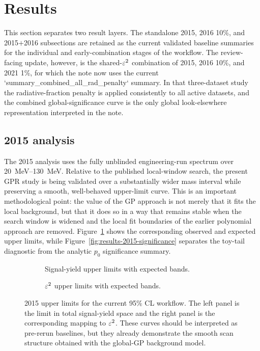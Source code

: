 \section{Results}
\label{sec:results}

This section separates two result layers. The standalone 2015, 2016 10\%, and
2015$+$2016 subsections are retained as the current validated baseline summaries for
the individual and early-combination stages of the workflow. The review-facing update,
however, is the shared-$\varepsilon^2$ combination of 2015, 2016 10\%, and 2021 1\%, for
which the note now uses the current `summary\_combined\_all\_rad\_penalty` summary. In
that three-dataset study the radiative-fraction penalty is applied consistently to all
active datasets, and the combined global-significance curve is the only global
look-elsewhere representation interpreted in the note.

\subsection{2015 analysis}
\label{sec:results-2015}

The 2015 analysis uses the fully unblinded engineering-run spectrum over
\SIrange{20}{130}{MeV}. Relative to the published local-window search, the present GPR
study is being validated over a substantially wider mass interval while preserving a
smooth, well-behaved upper-limit curve. This is an important methodological point: the
value of the GP approach is not merely that it fits the local background, but that it
does so in a way that remains stable when the search window is widened and the local
fit boundaries of the earlier polynomial approach are removed.
Figure~\ref{fig:results-2015-ul} shows the corresponding observed and expected upper
limits, while Figure~\ref{fig:results-2015-significance} separates the toy-tail
diagnostic from the analytic $p_0$ significance summary.

\begin{figure}[H]
\centering
\begin{subfigure}[t]{0.48\linewidth}
  \centering
  \caption{Signal-yield upper limits with expected bands.}
\end{subfigure}
\hfill
\begin{subfigure}[t]{0.48\linewidth}
  \centering
  \caption{$\varepsilon^2$ upper limits with expected bands.}
\end{subfigure}
\caption{2015 upper limits for the current 95\% CL workflow. The left panel is the
limit in total signal-yield space and the right panel is the corresponding mapping to
$\varepsilon^2$. These curves should be interpreted as pre-rerun baselines, but they already
demonstrate the smooth scan structure obtained with the global-GP background model.}
\label{fig:results-2015-ul}
\end{figure}

